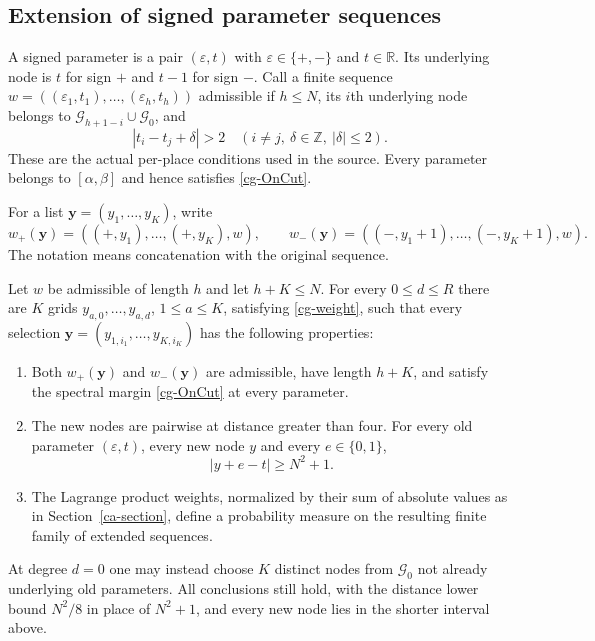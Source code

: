 \subsection{Extension of signed parameter sequences}

A signed parameter is a pair $(\varepsilon,t)$ with
$\varepsilon\in\{+,-\}$ and $t\in\mathbb R$.
Its underlying node is $t$ for sign $+$ and $t-1$
for sign $-$.
Call a finite sequence
$w=((\varepsilon_1,t_1),\ldots,(\varepsilon_h,t_h))$
admissible if $h\leq N$, its $i$th underlying node belongs to
$\mathcal G_{h+1-i}\cup\mathcal G_0$, and
\begin{equation}\label{cg-admissible}
       |t_i-t_j+\delta|>2
       \quad(i\ne j,\ \delta\in\mathbb Z,\ |\delta|\leq2).
\end{equation}
These are the actual per-place conditions used in the
source.  Every parameter belongs to $[\alpha,\beta]$
and hence satisfies \eqref{cg-OnCut}.

For a list $\boldsymbol y=(y_1,\ldots,y_K)$, write
\[
 w_+(\boldsymbol y)
       =((+,y_1),\ldots,(+,y_K),w),\qquad
 w_-(\boldsymbol y)
       =((-,y_1+1),\ldots,(-,y_K+1),w).
\]
The notation means concatenation with the original sequence.

\begin{theorem}\label{cg-extension}
Let $w$ be admissible of length $h$ and let $h+K\leq N$.
For every $0\leq d\leq R$ there are $K$ grids
$y_{a,0},\ldots,y_{a,d}$, $1\leq a\leq K$, satisfying
\eqref{cg-weight}, such that every selection
$\boldsymbol y=(y_{1,i_1},\ldots,y_{K,i_K})$
has the following properties:

\begin{enumerate}
\item Both $w_+(\boldsymbol y)$ and $w_-(\boldsymbol y)$
are admissible, have length $h+K$, and satisfy the
spectral margin \eqref{cg-OnCut} at every parameter.
\item The new nodes are pairwise at distance greater
than four.  For every old parameter $(\varepsilon,t)$,
every new node $y$ and every $e\in\{0,1\}$,
\[
                         |y+e-t|\geq N^2+1.
\]
\item The Lagrange product weights, normalized by their
sum of absolute values as in
Section~\ref{ca-section}, define a probability measure
on the resulting finite family of extended sequences.
\end{enumerate}
At degree $d=0$ one may instead choose $K$ distinct
nodes from $\mathcal G_0$ not already underlying old
parameters.  All conclusions still hold, with the
distance lower bound $N^2/8$ in place of $N^2+1$,
and every new node lies in the shorter interval above.
\end{theorem}

